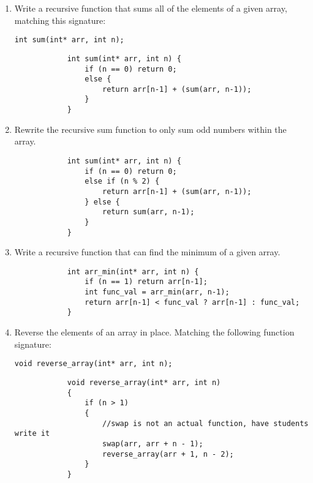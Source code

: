 \documentclass[11pt]{article}
\begin{document}
    \begin{enumerate}
        \item Write a recursive function that sums all of the elements of a given array, matching this signature: \begin{verbatim}int sum(int* arr, int n);
        \end{verbatim}
        \begin{verbatim}
            int sum(int* arr, int n) {
                if (n == 0) return 0;
                else {
                    return arr[n-1] + (sum(arr, n-1));
                }
            }
        \end{verbatim}
        \item Rewrite the recursive sum function to only sum odd numbers within the array.
        \begin{verbatim}
            int sum(int* arr, int n) {
                if (n == 0) return 0;
                else if (n % 2) {
                    return arr[n-1] + (sum(arr, n-1));
                } else {
                    return sum(arr, n-1);
                }
            }
        \end{verbatim}
        \item Write a recursive function that can find the minimum of a given array.
        \begin{verbatim}
            int arr_min(int* arr, int n) {
                if (n == 1) return arr[n-1];
                int func_val = arr_min(arr, n-1);
                return arr[n-1] < func_val ? arr[n-1] : func_val;
            }
        \end{verbatim}
        \item Reverse the elements of an array in place. Matching the following function signature: 
    
        \verb|void reverse_array(int* arr, int n);|
        
        \begin{verbatim}
            void reverse_array(int* arr, int n)
            {
                if (n > 1)
                {
                    //swap is not an actual function, have students write it              
                    swap(arr, arr + n - 1);
                    reverse_array(arr + 1, n - 2);
                }
            }
        \end{verbatim}


\end{enumerate}
\end{document}
